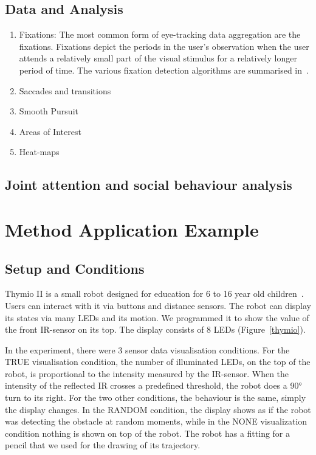 \documentclass{sig-alternate}
\begin{document}
\subsection{Data and Analysis}

\begin{enumerate}
\item Fixations: The most common form of eye-tracking data aggregation are the fixations.
Fixations depict the periods in the user's observation when the user
attends a relatively small part of the visual stimulus for a relatively
longer period of time. The various fixation detection algorithms are
summarised in~\cite{duchowski2007eye}. 

\item Saccades and transitions
\item Smooth Pursuit
\item Areas of Interest
\item Heat-maps

\end {enumerate}


\subsection{Joint attention and social behaviour analysis}


\section{Method Application Example}

\subsection{Setup and Conditions}

Thymio II is a small robot designed for education for 6 to 16 year old
children~\cite{magnenat2012programming, riedo2012two}. Users can interact with
it via buttons and distance sensors. The robot can display its states via many
LEDs and its motion. We programmed it to show the value of the front IR-sensor
on its top. The display consists of 8 LEDs (Figure~\ref{thymio}).

In the experiment, there were 3 sensor data visualisation conditions.  For the
{\sf TRUE} visualisation condition, the number of illuminated LEDs, on the top of the
robot, is proportional to the intensity measured by the IR-sensor. When the
intensity of the reflected IR crosses a predefined threshold, the robot does a
90° turn to its right. For the two other conditions, the behaviour is the same,
simply the display changes. In the {\sf RANDOM} condition, the display shows as if the
robot was detecting the obstacle at random moments, while in the {\sf NONE}
visualization condition nothing is shown on top of the robot. The robot has a
fitting for a pencil that we used for the drawing of its trajectory.
\end{document}
